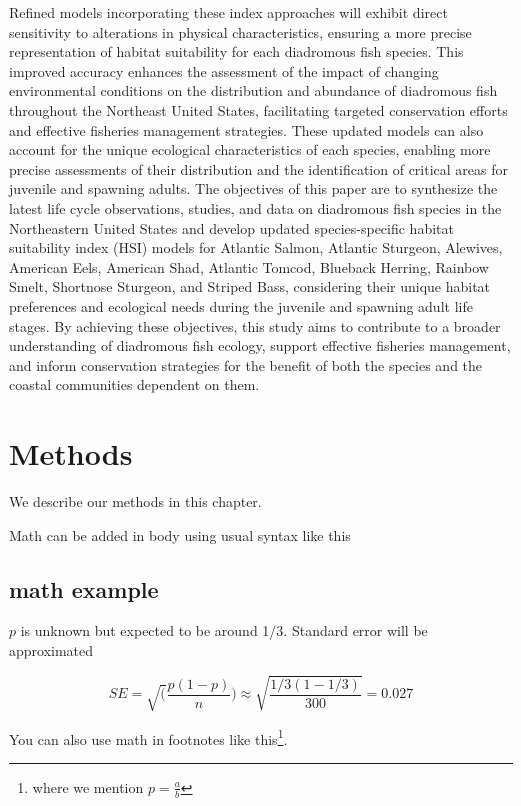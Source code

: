\documentclass[
]{book}
\begin{document}
Refined models incorporating these index approaches will exhibit direct sensitivity to alterations in physical characteristics, ensuring a more precise representation of habitat suitability for each diadromous fish species. This improved accuracy enhances the assessment of the impact of changing environmental conditions on the distribution and abundance of diadromous fish throughout the Northeast United States, facilitating targeted conservation efforts and effective fisheries management strategies. These updated models can also account for the unique ecological characteristics of each species, enabling more precise assessments of their distribution and the identification of critical areas for juvenile and spawning adults. The objectives of this paper are to synthesize the latest life cycle observations, studies, and data on diadromous fish species in the Northeastern United States and develop updated species-specific habitat suitability index (HSI) models for Atlantic Salmon, Atlantic Sturgeon, Alewives, American Eels, American Shad, Atlantic Tomcod, Blueback Herring, Rainbow Smelt, Shortnose Sturgeon, and Striped Bass, considering their unique habitat preferences and ecological needs during the juvenile and spawning adult life stages. By achieving these objectives, this study aims to contribute to a broader understanding of diadromous fish ecology, support effective fisheries management, and inform conservation strategies for the benefit of both the species and the coastal communities dependent on them.

\hypertarget{methods}{%
\chapter{Methods}\label{methods}}

We describe our methods in this chapter.

Math can be added in body using usual syntax like this

\hypertarget{math-example}{%
\section{math example}\label{math-example}}

\(p\) is unknown but expected to be around 1/3. Standard error will be approximated

\[
SE = \sqrt(\frac{p(1-p)}{n}) \approx \sqrt{\frac{1/3 (1 - 1/3)} {300}} = 0.027
\]

You can also use math in footnotes like this\footnote{where we mention \(p = \frac{a}{b}\)}.
\end{document}

